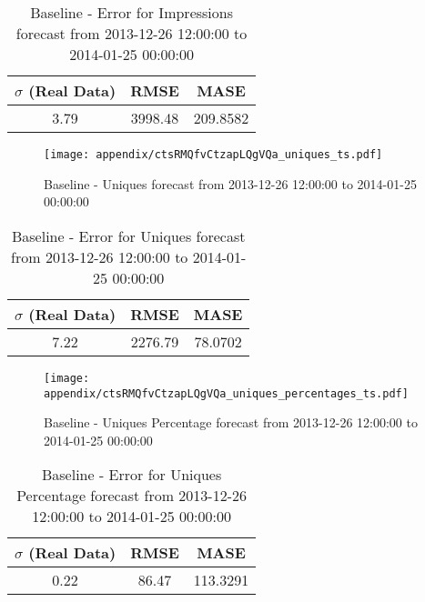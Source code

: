 \begin{table}[H]
\centering
\footnotesize
\begin{tabular}{ccc}
$\sigma$ (Real Data) & RMSE & MASE   \\ \hline
3.79 & 3998.48 & 209.8582 \\
\end{tabular}

\vspace{0.5cm}

\caption{
Baseline - Error for Impressions forecast from 2013-12-26 12:00:00 to 2014-01-25 00:00:00}
\end{table}

\begin{figure}[H] \begin{center} \leavevmode
\texttt{[image: appendix/ctsRMQfvCtzapLQgVQa\_uniques\_ts.pdf]} \caption{
Baseline - Uniques forecast from 2013-12-26 12:00:00 to 2014-01-25 00:00:00} \label{fig:appendix/ctsRMQfvCtzapLQgVQa_uniques_ts.pdf} \end{center}
\end{figure}

\begin{table}[H]
\centering
\footnotesize
\begin{tabular}{ccc}
$\sigma$ (Real Data) & RMSE & MASE   \\ \hline
7.22 & 2276.79 & 78.0702 \\
\end{tabular}

\vspace{0.5cm}

\caption{
Baseline - Error for Uniques forecast from 2013-12-26 12:00:00 to 2014-01-25 00:00:00}
\end{table}

\begin{figure}[H] \begin{center} \leavevmode
\texttt{[image: appendix/ctsRMQfvCtzapLQgVQa\_uniques\_percentages\_ts.pdf]} \caption{
Baseline - Uniques Percentage forecast from 2013-12-26 12:00:00 to 2014-01-25 00:00:00} \label{fig:appendix/ctsRMQfvCtzapLQgVQa_uniques_percentages_ts.pdf} \end{center}
\end{figure}

\begin{table}[H]
\centering
\footnotesize
\begin{tabular}{ccc}
$\sigma$ (Real Data) & RMSE & MASE   \\ \hline
0.22 & 86.47 & 113.3291 \\
\end{tabular}

\vspace{0.5cm}

\caption{
Baseline - Error for Uniques Percentage forecast from 2013-12-26 12:00:00 to 2014-01-25 00:00:00}
\end{table}

